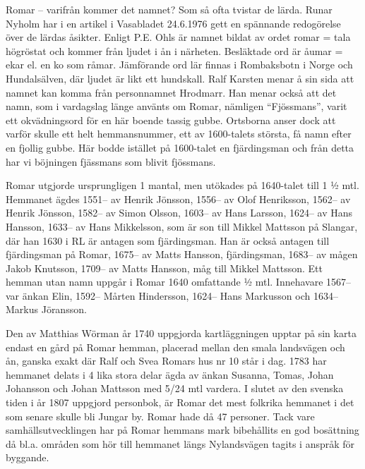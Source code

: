 %

Romar – varifrån kommer det namnet? Som så ofta tvistar de lärda. Runar Nyholm har i en artikel i Vasabladet 24.6.1976 gett en spännande redogörelse över de lärdas åsikter. Enligt P.E. Ohls är namnet bildat av ordet romar  = tala högröstat och kommer från ljudet i ån i närheten. Besläktade ord är åumar  = ekar el. en ko som råmar. Jämförande ord lär finnas i Rombaksbotn i Norge och Hundalsälven, där ljudet är likt ett hundskall. Ralf Karsten menar å sin sida att namnet kan komma från personnamnet Hrodmarr. Han menar också att det namn, som i vardagslag länge använts om Romar, nämligen ``Fjössmans'', varit ett okvädningsord för en här boende tassig gubbe. Ortsborna anser dock att varför skulle ett helt hemmansnummer, ett av 1600-talets största, få namn efter en fjollig gubbe. Här bodde istället på 1600-talet en fjärdingsman och från detta har vi böjningen fjässmans som blivit fjössmans.

Romar utgjorde ursprungligen 1 mantal, men utökades på 1640-talet till 1 ½ mtl. Hemmanet ägdes 1551-- av Henrik Jönsson, 1556-- av Olof Henriksson, 1562-- av Henrik Jönsson, 1582-- av Simon Olsson, 1603-- av Hans Larsson, 1624-- av Hans Hansson, 1633-- av Hans Mikkelsson, som är son till Mikkel Mattsson på Slangar, där han 1630 i RL är antagen som fjärdingsman. Han är också antagen till fjärdingsman på Romar, 1675-- av Matts Hansson, fjärdingsman, 1683-- av mågen Jakob Knutsson, 1709-- av Matts Hansson, måg till Mikkel Mattsson. Ett hemman utan namn uppgår i Romar 1640 omfattande ½ mtl. Innehavare 1567-- var änkan Elin, 1592-- Mårten Hindersson, 1624-- Hans Markusson och 1634-- Markus Jöransson.

Den av Matthias Wörman år 1740 uppgjorda kartläggningen upptar på sin karta endast en gård på Romar hemman, placerad mellan den smala landsvägen och ån, ganska exakt där Ralf och Svea Romars hus nr 10 står i dag. 1783 har hemmanet delats i 4 lika stora delar ägda av änkan Susanna, Tomas, Johan Johansson och Johan Mattsson med 5/24 mtl vardera. I slutet av den svenska tiden i år 1807 uppgjord personbok, är Romar det mest folkrika hemmanet i det som senare skulle bli Jungar by. Romar hade då 47 personer. Tack vare samhällsutvecklingen har på Romar hemmans mark bibehållits en god bosättning då bl.a. områden som hör till hemmanet längs Nylandsvägen tagits i anspråk för byggande.

